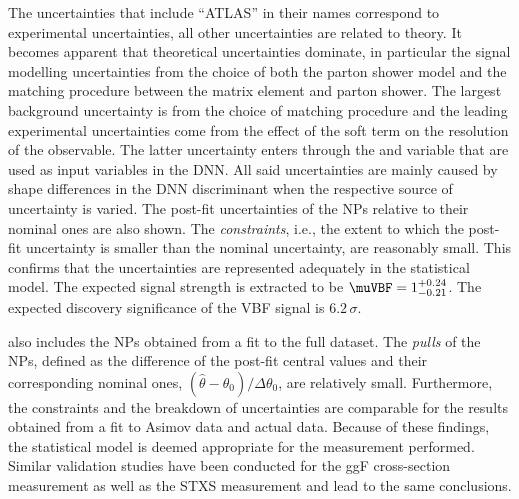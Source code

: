 The uncertainties that include ``ATLAS'' in their names correspond to experimental uncertainties, all other uncertainties are related to theory. 
It becomes apparent that theoretical uncertainties dominate, in particular the signal modelling uncertainties from the choice of both the parton shower model and the matching procedure between the matrix element and parton shower. 
The largest background uncertainty is from the choice of \ttbar matching procedure and the leading experimental uncertainties come from the effect of the \MET soft term on the resolution of the \MET observable. 
The latter uncertainty enters through the \pTtot and \METSig variable that are used as input variables in the DNN.
All said uncertainties are mainly caused by shape differences in the DNN discriminant when the respective source of uncertainty is varied.
The post-fit uncertainties of the NPs relative to their nominal ones are also shown. The \emph{constraints}, i.e., the extent to which the post-fit uncertainty is smaller than the nominal uncertainty, are reasonably small.
This confirms that the uncertainties are represented adequately in the statistical model. 
The expected signal strength is extracted to be $\muVBF = 1^{+0.24}_{-0.21}$.
The expected discovery significance of the VBF signal is $6.2\,\sigma$. 

 also includes the NPs obtained from a fit to the full \RunTwo dataset. 
The \emph{pulls} of the NPs, defined as the difference of the post-fit central values and their corresponding nominal ones, $(\hat{\theta} - \theta_0 ) / \Delta \theta_0$, are relatively small. 
Furthermore, the constraints and the breakdown of uncertainties are comparable for the results obtained from a fit to Asimov data and actual data. 
Because of these findings, the statistical model is deemed appropriate for the measurement performed. 
Similar validation studies have been conducted for the ggF cross-section measurement as well as the STXS measurement and lead to the same conclusions. 

